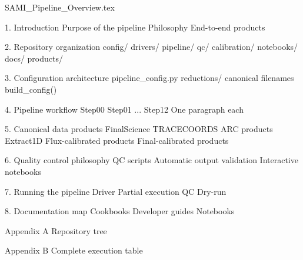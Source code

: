 SAMI_Pipeline_Overview.tex

1. Introduction
    Purpose of the pipeline
    Philosophy
    End-to-end products

2. Repository organization
    config/
    drivers/
    pipeline/
    qc/
    calibration/
    notebooks/
    docs/
    products/

3. Configuration architecture
    pipeline_config.py
    reductions/
    canonical filenames
    build_config()

4. Pipeline workflow
    Step00
    Step01
    ...
    Step12
    One paragraph each

5. Canonical data products
    FinalScience
    TRACECOORDS
    ARC products
    Extract1D
    Flux-calibrated products
    Final-calibrated products

6. Quality control philosophy
    QC scripts
    Automatic output validation
    Interactive notebooks

7. Running the pipeline
    Driver
    Partial execution
    QC
    Dry-run

8. Documentation map
    Cookbooks
    Developer guides
    Notebooks

Appendix A
    Repository tree

Appendix B
    Complete execution table